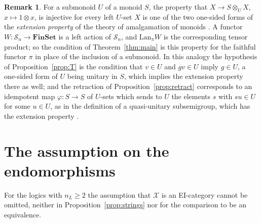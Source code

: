 \documentclass[11pt]{amsart}
\theoremstyle{definition}
\newtheorem{rem}[thm]{Remark}
\newcommand{\Fin}{\mathbf{FinSet}}
\newcommand{\cX}{\mathcal X}
\newcommand{\cS}{\mathcal S}
\begin{document}
\begin{rem}\label{rem:ext}
For a submonoid $U$ of a monoid $S$, the property that $X\to
S\otimes_UX$, $x\mapsto1\otimes x$, is injective for every left
$U$-set $X$ is one of the two one-sided forms of the \emph{extension
property} of the theory of amalgamation of monoids \cite{Renshaw86,
AlSubaieiRenshaw}. A functor $W\colon\cS_n\to\Fin$ is a left action
of $\cS_n$, and $\mathrm{Lan}_\pi W$ is the corresponding tensor
product; so the condition of Theorem~\ref{thm:main} is this property
for the faithful functor $\pi$ in place of the inclusion of a
submonoid. In this analogy the hypothesis of
Proposition~\ref{prop:T} is the condition that $v\in U$ and $gv\in U$
imply $g\in U$, a one-sided form of $U$ being unitary in $S$, which
implies the extension property there as well; and the retraction of
Proposition~\ref{prop:retract} corresponds to an idempotent map
$\varphi\colon S\to S$ of $U$-sets which sends to $U$ the elements
$s$ with $su\in U$ for some $u\in U$, as in the definition of a
quasi-unitary subsemigroup, which has the extension property
\cite[Ch.~III, Cor.~1.12]{RenshawThesis}.
\end{rem}

\section{The assumption on the endomorphisms}\label{sec:nonEI}

For the logics with $n_L\ge2$ the assumption that $\cX$ is an
EI-category cannot be omitted, neither in
Proposition~\ref{prop:strings} nor for the comparison to be an
equivalence.
\end{document}
